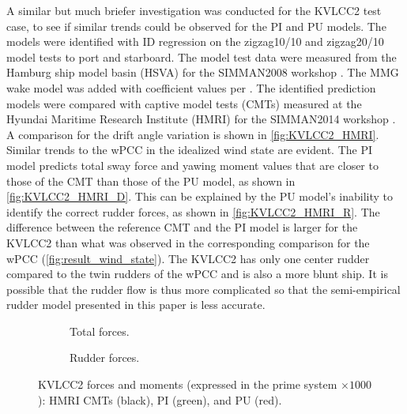 A similar but much briefer investigation was conducted for the KVLCC2 test case, to see if similar trends could be observed for the PI and PU models. The models were identified with ID regression on the zigzag10/10 and zigzag20/10 model tests to port and starboard. The model test data were measured from the Hamburg ship model basin (HSVA) for the SIMMAN2008 workshop \citep{stern_experience_2011}.
The MMG wake model was added with coefficient values per \citet{yasukawa_introduction_2015}.
The identified prediction models were compared with captive model tests (CMTs) measured at the Hyundai Maritime Research Institute (HMRI) for the SIMMAN2014 workshop \citep{ittc_final_2017}. A comparison for the drift angle variation is shown in \autoref{fig:KVLCC2_HMRI}. 
Similar trends to the wPCC in the idealized wind state are evident. The PI model predicts total sway force and yawing moment values that are closer to those of the CMT than those of the PU model, as shown in \autoref{fig:KVLCC2_HMRI_D}.
This can be explained by the PU model's inability to identify the correct rudder forces, as shown in \autoref{fig:KVLCC2_HMRI_R}. 
The difference between the reference CMT and the PI model is larger for the KVLCC2 than what was observed in the corresponding comparison for the wPCC (\autoref{fig:result_wind_state}).
The KVLCC2 has only one center rudder compared to the twin rudders of the wPCC and is also a more blunt ship. It is possible that the rudder flow is thus more complicated so that the semi-empirical rudder model presented in this paper is less accurate.
%
\begin{figure}
    \centering
    \begin{subfigure}[b]{0.49\textwidth}
        \centering
        
        \caption{Total forces.}
        \label{fig:KVLCC2_HMRI_D}
    \end{subfigure}
    \hfill
    \begin{subfigure}[b]{0.49\textwidth}
        \centering
        
        \caption{Rudder forces.}
        \label{fig:KVLCC2_HMRI_R}
    \end{subfigure}
    \caption{KVLCC2 forces and moments (expressed in the prime system $\times 1000$): HMRI CMTs (black), PI (green), and PU (red).}
    \label{fig:KVLCC2_HMRI}
\end{figure}
